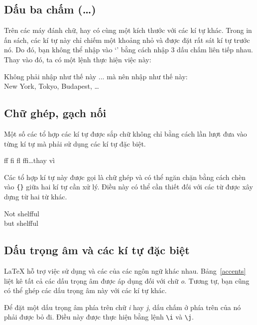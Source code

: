 \subsection{Dấu ba chấm (\texorpdfstring{\ldots}{...})}

Trên các máy đánh chữ,  hay  có cùng một kích thước với các kí tự khác. Trong in ấn sách, các kí tự này chỉ chiếm một khoảng nhỏ và được đặt rất sát kí tự trước nó. Do đó, bạn không thể nhập vào `' bằng cách nhập 3 dấu chấm liên tiếp nhau. Thay vào đó, ta có một lệnh thực hiện việc này:
\begin{lscommand}
\end{lscommand}
\begin{example}
Không phải nhập như thế này ...
mà nên nhập như thế này:\\
New York, Tokyo, Budapest, \ldots
\end{example}

\subsection{Chữ ghép, gạch nối}
Một số các tổ hợp các kí tự được sắp chữ không chỉ bằng cách lần lượt đưa vào từng kí tự mà phải sử dụng các kí tự đặc biệt.
\begin{code}
{\large ff fi fl ffi\ldots}\quad thay vì 
\end{code}
Các tổ hợp kí tự này được gọi là chữ ghép và có thể ngăn chặn bằng cách chèn vào \verb|{}| giữa hai kí tự cần xử lý. Điều này có thể cần thiết đối với các từ được xây dựng từ hai từ khác.
\begin{example}
\Large Not shelfful\\
but shelf\mbox{}ful
\end{example}

\subsection{Dấu trọng âm và các kí tự đặc biệt}
\LaTeX{} hỗ trợ việc sử dụng  và các  của các ngôn ngữ khác nhau. Bảng~\ref{accents} liệt kê tất cả các dấu trọng âm được áp dụng đối với chữ \emph{o}. Tương tự, bạn cũng có thể ghép các dấu trọng âm này với các kí tự khác.

Để đặt một dấu trọng âm phía trên chữ \emph{i} hay \emph{j}, dấu
chấm ở phía trên của nó phải được bỏ đi. Điều này được thực hiện
bằng lệnh \verb|\i| và \verb|\j|.

